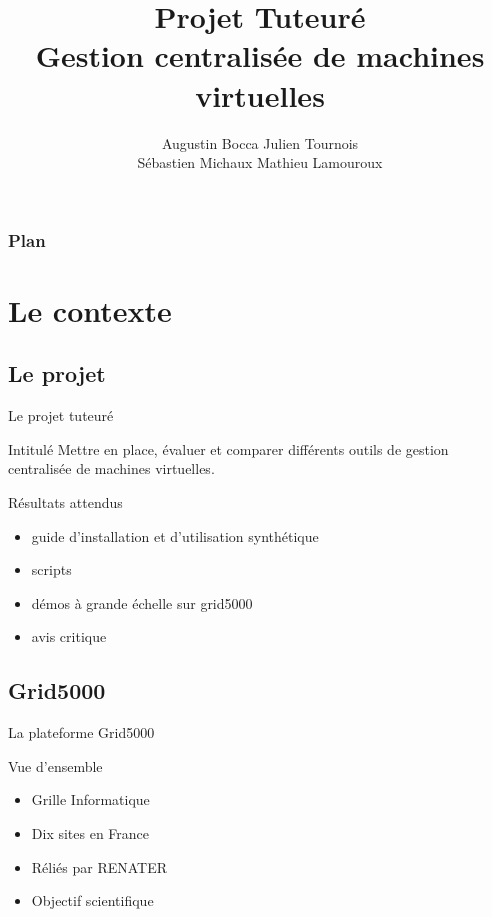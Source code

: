\documentclass{beamer}
\title{Projet Tuteuré \\Gestion centralisée de machines virtuelles}
\author{Augustin Bocca Julien Tournois\\Sébastien Michaux Mathieu Lamouroux}
\institute{IUT de Nancy Charlemagne}
\begin{document}

\begin{frame}
  \titlepage
\end{frame}

\begin{frame}
    \frametitle{Plan}
    \tableofcontents
\end{frame}

\section{Le contexte}
\subsection{Le projet}
\begin{frame}{Le projet tuteuré}
\begin{block}{Intitulé}
Mettre en place, évaluer et comparer différents outils de gestion centralisée de machines virtuelles.
\end{block}
\pause
\begin{block}{Résultats attendus}
  \begin{itemize}
    \item guide d'installation et d'utilisation synthétique
\pause
    \item scripts
\pause
    \item démos à grande échelle sur grid5000
\pause
    \item avis critique
   \end{itemize}
\end{block}
\end{frame}

\subsection{Grid5000}
\begin{frame}{La plateforme Grid5000}
\begin{block}{Vue d'ensemble}
  \begin{itemize}
    \item Grille Informatique
\pause
    \item Dix sites en France
\pause
    \item Réliés par RENATER
\pause
    \item Objectif scientifique
  \end{itemize}
\end{block}
\end{frame}
\end{document}
